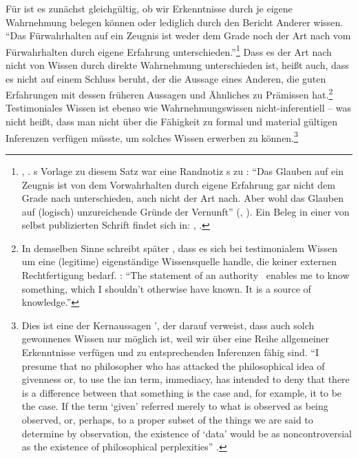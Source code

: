 Für  ist es zunächst gleichgültig, ob wir Erkenntnisse durch je
eigene Wahrnehmung belegen können oder lediglich durch den Bericht Anderer
wissen. \enquote{Das Fürwahrhalten auf ein Zeugnis ist weder dem Grade noch der
Art nach vom Fürwahrhalten durch eigene Erfahrung
unterschieden.}\footnote{\label{Fussnote:ZeugnisundeigeneErfahrunggemaessJaescheLogik}\cite[][A~103]{Kant:ImmanuelKantsLogik1977},
\cite[][IX: 69.2--4]{Kant:GesammelteWerke1900ff.}.
s Vorlage zu diesem Satz war eine Randnotiz
s zu \cite[][\S~206]{Meier:AuszugausderVernunftlehre1752}
\parencite[][XVI: 496.28--30, 497.18--22]{Kant:GesammelteWerke1900ff.}:
\enquote{Das Glauben auf ein Zeugnis ist von dem Vorwahrhalten durch eigene
Erfahrung gar nicht dem Grade nach unterschieden, auch nicht der Art nach. Aber
wohl das Glauben auf (logisch) unzureichende Gründe der Vernunft} (\cite[][]{Kant:Reflexionen1900ff.}, \cite[][XVI:
501.9--12]{Kant:GesammelteWerke1900ff.}). Ein Beleg in einer von
 selbst publizierten Schrift findet sich in:
\cite[][A~319]{Kant:Washeisst:SichimDenkenorientieren?1977}, \cite[][VIII:
141.10--17]{Kant:GesammelteWerke1900ff.}.} Dass es der Art nach nicht von Wissen
durch direkte Wahrnehmung unterschieden ist, heißt auch, dass es nicht auf einem
Schluss beruht, der die Aussage eines Anderen, die guten Erfahrungen mit dessen
früheren Aussagen und Ähnliches zu
Prämissen hat.\footnote{In demselben Sinne schreibt später ,
dass es sich bei testimonialem Wissen um eine (legitime) eigenständige
Wissensquelle handle, die keiner externen Rechtfertigung
bedarf. \cite[Vgl.][82]{Austin:OtherMinds1979}: \enquote{The statement
of an authority \punkt\ enables me to know something, which I shouldn't
otherwise have known. It is a source of knowledge.}} Testimoniales Wissen ist
ebenso wie Wahrnehmungswissen nicht-inferentiell -- was nicht heißt, dass man
nicht über die Fähigkeit zu formal und material
gültigen Inferenzen verfügen müsste, um solches Wissen erwerben zu
können.\footnote{Dies ist eine der Kernaussagen
', der darauf
verweist, dass auch solch  gewonnenes Wissen nur möglich ist,
weil wir über eine Reihe allgemeiner Erkenntnisse verfügen und zu entsprechenden
Inferenzen fähig sind. \enquote{I presume that no philosopher who has attacked
the philosophical idea of givenness or, to use the
ian term, immediacy, has intended to deny that
there is a difference between  that something is the case and,
for example,  it to be the case. If the term \enquote{given}
referred merely to what is observed as being observed, or, perhaps, to a proper
subset of the things we are said to determine by observation, the existence of
\enquote{data} would be as noncontroversial as the existence of philosophical
perplexities} \parencite[][13]{Sellars:EmpiricismandthePhilosophyofMind1997}.}


